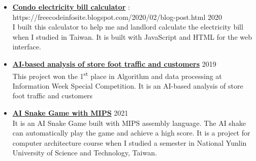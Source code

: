 \begin{itemize}
\item \href{https://freecodeinfosite.blogspot.com/2020/02/blog-post.html}{\textbf{Condo electricity bill calculator}} : https://freecodeinfosite.blogspot.com/2020/02/blog-post.html \hfill 2020\\
I built this calculator to help me and landlord calculate the electricity bill when I studied in Taiwan. It is built with JavaScript and HTML for the web interface.
\item \href{https://www.youtube.com/watch?v=D4eXmWE0Ixo}{\textbf{AI-based analysis of store foot traffic and customers}} \hfill 2019\\
This project won the 1\textsuperscript{st} place in Algorithm and data processing at Information Week Special Competition. It is an AI-based analysis of store foot traffic and customers
\item \href{https://www.youtube.com/watch?v=1JVbP61-KmU}{\textbf{AI Snake Game with MIPS}} \hfill 2021\\
It is an AI Snake Game built with MIPS assembly language. The AI shake can automatically play the game and achieve a high score. It is a project for computer architecture course when I studied a semester in National Yunlin University of Science and Technology, Taiwan.
\end{itemize}